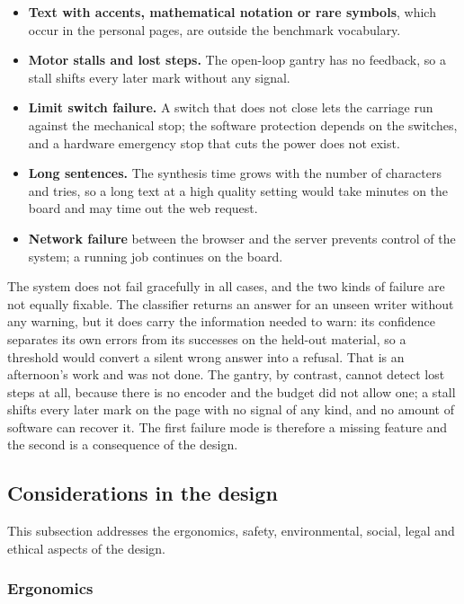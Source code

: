 \begin{itemize}
          \item \textbf{Text with accents, mathematical notation or rare symbols}, which occur in the personal pages, are outside the benchmark vocabulary.
          \item \textbf{Motor stalls and lost steps.} The open-loop gantry has no feedback, so a stall shifts every later mark without any signal.
          \item \textbf{Limit switch failure.} A switch that does not close lets the carriage run against the mechanical stop; the software protection depends on the switches, and a hardware emergency stop that cuts the power does not exist.
          \item \textbf{Long sentences.} The synthesis time grows with the number of characters and tries, so a long text at a high quality setting would take minutes on the board and may time out the web request.
          \item \textbf{Network failure} between the browser and the server prevents control of the system; a running job continues on the board.
        \end{itemize}
        The system does not fail gracefully in all cases, and the two kinds of failure are not equally fixable.
        The classifier returns an answer for an unseen writer without any warning, but it does carry the information needed to warn: its confidence separates its own errors from its successes on the held-out material, so a threshold would convert a silent wrong answer into a refusal.
        That is an afternoon's work and was not done.
        The gantry, by contrast, cannot detect lost steps at all, because there is no encoder and the budget did not allow one; a stall shifts every later mark on the page with no signal of any kind, and no amount of software can recover it.
        The first failure mode is therefore a missing feature and the second is a consequence of the design.

\subsection{Considerations in the design} %
\label{sec:dis-considerations}

This subsection addresses the ergonomics, safety, environmental, social, legal and ethical aspects of the design.

    \subsubsection{Ergonomics}

